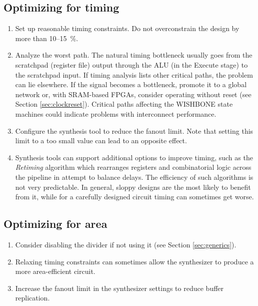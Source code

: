 \documentclass[a4paper,12pt,twoside,extrafontsizes]{memoir}
\begin{document}
\subsection{Optimizing for timing}

\begin{enumerate}
	\item Set up reasonable timing constraints. Do not overconstrain the design by more than 10--15~\%.
	
	\item Analyze the worst path. The natural \lxp{} timing bottleneck usually goes from the scratchpad (register file) output through the ALU (in the Execute stage) to the scratchpad input. If timing analysis lists other critical paths, the problem can lie elsewhere. If the  signal becomes a bottleneck, promote it to a global network or, with SRAM-based FPGAs, consider operating without reset (see Section \ref{sec:clockreset}). Critical paths affecting the WISHBONE state machines could indicate problems with interconnect performance.
	
	\item Configure the synthesis tool to reduce the fanout limit. Note that setting this limit to a too small value can lead to an opposite effect.
	
	\item Synthesis tools can support additional options to improve timing, such as the \emph{Retiming} algorithm which rearranges registers and combinatorial logic across the pipeline in attempt to balance delays. The efficiency of such algorithms is not very predictable. In general, sloppy designs are the most likely to benefit from it, while for a carefully designed circuit timing can sometimes get worse.
\end{enumerate}

\subsection{Optimizing for area}

\begin{enumerate}
	\item Consider disabling the divider if not using it (see Section \ref{sec:generics}).
	
	\item Relaxing timing constraints can sometimes allow the synthesizer to produce a more area-efficient circuit.
	
	\item Increase the fanout limit in the synthesizer settings to reduce buffer replication.
\end{enumerate}
\end{document}
